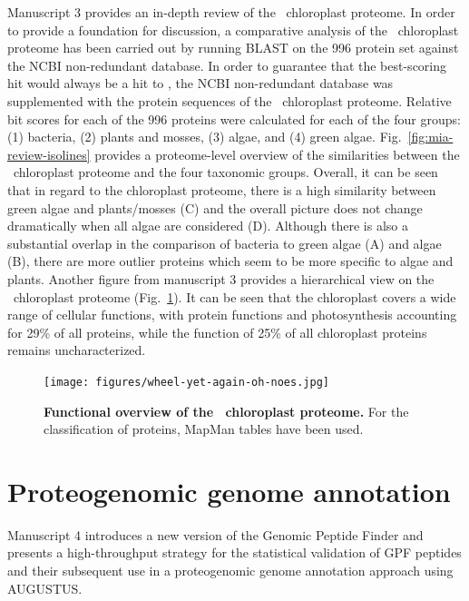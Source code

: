 Manuscript 3 provides an in-depth review of the \cre~chloroplast proteome.
In order to provide a foundation for discussion, a comparative analysis 
of the \cre~chloroplast proteome has been carried out by running BLAST
on the 996 protein set against the NCBI non-redundant database.
In order to guarantee that the best-scoring hit would always be a hit to
\cre, the NCBI non-redundant database was supplemented with the protein
sequences of the \cre~chloroplast proteome.
Relative bit scores for each of the 996 proteins were calculated for each of
the four groups: (1) bacteria, (2) plants and mosses, (3) algae, and (4) green 
algae.
Fig.~\ref{fig:mia-review-isolines} provides a proteome-level overview
of the similarities between the \cre~chloroplast proteome and the four taxonomic
groups.
Overall, it can be seen that in regard to the chloroplast proteome, there is
a high similarity between green algae and plants/mosses (C) and the overall
picture does not change dramatically when all algae are considered (D).
Although there is also a substantial overlap in the comparison of bacteria
to green algae (A) and algae (B), there are more outlier proteins which seem 
to be more specific to algae and plants.
Another figure from manuscript 3 provides a hierarchical view on the
\cre~chloroplast proteome (Fig.~\ref{fig:mia-review-wheel}).
It can be seen that the chloroplast covers a wide range of cellular
functions, with protein functions and photosynthesis accounting for
29\% of all proteins, while the function of 25\% of all chloroplast proteins 
remains uncharacterized.

\begin{figure}
\texttt{[image: figures/wheel-yet-again-oh-noes.jpg]}
\caption{
    {\bf Functional overview of the \cre~chloroplast proteome.}
    For the classification of proteins, MapMan tables \citep{Thimm2004} 
    have been used.
}
\label{fig:mia-review-wheel}
\end{figure}

\section{Proteogenomic genome annotation}

Manuscript 4 introduces a new version of the Genomic Peptide Finder and
presents a high-throughput strategy for the statistical validation of
GPF peptides and their subsequent use in a proteogenomic genome annotation
approach using AUGUSTUS.

